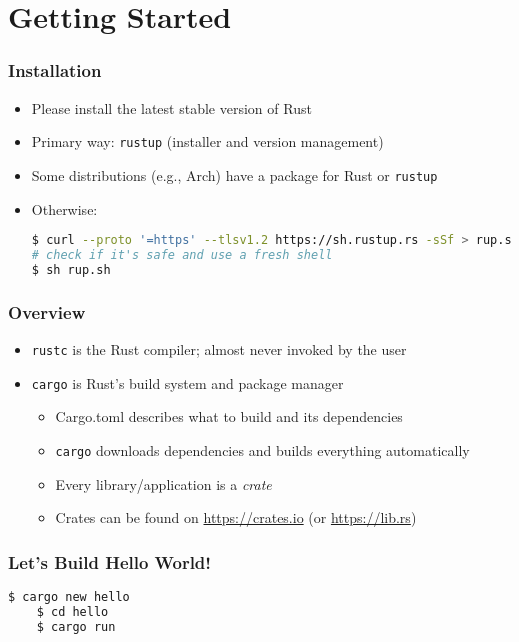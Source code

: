 \section{Getting Started}

\begin{frame}[fragile]
    \frametitle{Installation}

    \begin{itemize}
        \item Please install the latest stable version of Rust
        \item Primary way: \texttt{rustup} (installer and version management)
        \item Some distributions (e.g., Arch) have a package for Rust or \texttt{rustup}
        \item Otherwise:
\begin{lstlisting}[language=bash]
$ curl --proto '=https' --tlsv1.2 https://sh.rustup.rs -sSf > rup.sh
# check if it's safe and use a fresh shell
$ sh rup.sh
\end{lstlisting}
    \end{itemize}
\end{frame}

\begin{frame}
    \frametitle{Overview}

    \begin{itemize}
        \item \texttt{rustc} is the Rust compiler; almost never invoked by the user
        \item \texttt{cargo} is Rust's build system and package manager
        \begin{itemize}
            \item Cargo.toml describes what to build and its dependencies
            \item \texttt{cargo} downloads dependencies and builds everything automatically
            \item Every library/application is a \emph{crate}
            \item Crates can be found on \url{https://crates.io} (or \url{https://lib.rs})
        \end{itemize}
    \end{itemize}
\end{frame}

\begin{frame}[fragile]
    \frametitle{Let's Build Hello World!}

    \begin{lstlisting}[language=bash]
    $ cargo new hello
    $ cd hello
    $ cargo run
    \end{lstlisting}
\end{frame}
